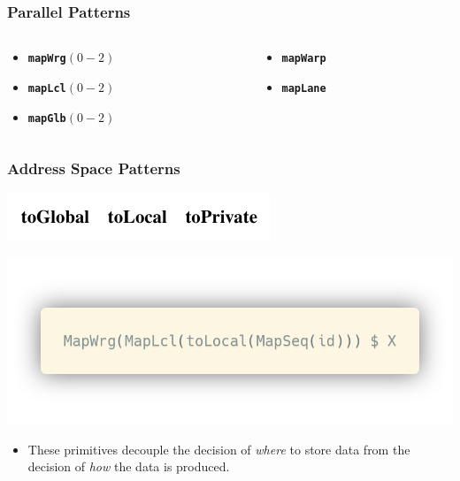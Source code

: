 \documentclass[10pt]{beamer}
\newcommand{\code}[1]{\textbf{\texttt{#1}}}
\begin{document}
\begin{frame}
\frametitle{Parallel Patterns}
\begin{columns}[onlytextwidth]
\begin{column}{0.45\textwidth}
\begin{itemize}
	\item \code{mapWrg$(0-2)$}
	\item \code{mapLcl$(0-2)$}
	\item \code{mapGlb$(0-2)$}
\end{itemize}
\end{column}
\begin{column}{0.45\textwidth}
\begin{itemize}	
	\item \code{mapWarp}
	\item \code{mapLane}
\end{itemize}
\end{column}
\end{columns}
\end{frame}

\begin{frame}
\frametitle{Address Space Patterns}
    \begin{block}{}
        \begin{center}
            \includegraphics[width=.55\textwidth]{../images/address_space_patterns.pdf}
        \end{center}
        \begin{center}
            \includegraphics[width=.55\textwidth]{../images/toLocal.png}
        \end{center}
    \end{block}
\begin{itemize}
    \item These primitives decouple the decision of \textit{where} to store data from the decision of \textit{how} the data is produced.
\end{itemize}
\end{frame}
\end{document}
